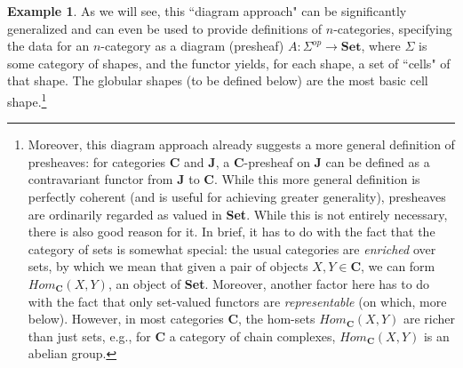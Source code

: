 \documentclass[11pt]{book}
\theoremstyle{definition}
\newtheorem{example}{Example}[section]
\theoremstyle{definition}
\theoremstyle{definition}
\theoremstyle{theorem}
\theoremstyle{definition}
\begin{document}
\begin{example}
	As we will see, this ``diagram approach" can be significantly generalized and can even be used to provide definitions of $n$-categories, specifying the data for an $n$-category as a diagram (presheaf) $A: \Sigma^{op} \rightarrow \textbf{Set}$, where $\Sigma$ is some category of shapes, and the functor yields, for each shape, a set of ``cells" of that shape. The globular shapes (to be defined below) are the most basic cell shape.\footnote{Moreover, this diagram approach already suggests a more general definition of presheaves: for categories \textbf{C} and \textbf{J}, a \textbf{C}-presheaf on \textbf{J} can be defined as a contravariant functor from \textbf{J} to \textbf{C}. While this more general definition is perfectly coherent (and is useful for achieving greater generality), presheaves are ordinarily regarded as valued in \textbf{Set}. While this is not entirely necessary, there is also good reason for it. In brief, it has to do with the fact that the category of sets is somewhat special: the usual categories are \textit{enriched} over sets, by which we mean that given a pair of objects $X, Y \in \textbf{C}$, we can form $Hom_{\textbf{C}}(X,Y)$, an object of \textbf{Set}. Moreover, another factor here has to do with the fact that only set-valued functors are \textit{representable} (on which, more below). However, in most categories $\textbf{C}$, the hom-sets $Hom_{\textbf{C}}(X,Y)$ are richer than just sets, e.g., for $\textbf{C}$ a category of chain complexes, $Hom_{\textbf{C}}(X,Y)$ is an abelian group.}
\end{example} 
\end{document}
